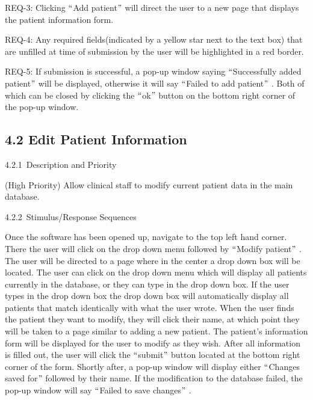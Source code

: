 \documentclass[12pt]{article}
\renewcommand{\_}{\kern-1.5pt\textunderscore\kern-1.5pt}
\begin{document}
\begin{adjustwidth}{0.5in}{0.0in}
REQ-3: Clicking $``$Add patient$"$  will direct the user to a new page that displays the patient information form.\par

\end{adjustwidth}

\begin{adjustwidth}{0.5in}{0.0in}
REQ-4: Any required fields(indicated by a yellow star next to the text box) that are unfilled at time of submission by the user will be highlighted in a red border. \par

\end{adjustwidth}

\begin{adjustwidth}{0.5in}{0.0in}
REQ-5: If submission is successful, a pop-up window saying $``$Successfully added patient$"$  will be displayed, otherwise it will say $``$Failed to add patient$"$ . Both of which can be closed by clicking the $``$ok$"$  button on the bottom right corner of the pop-up window.\par

\end{adjustwidth}

\setlength{\parskip}{3.96pt}
\subsection*{4.2 \hspace*{10pt}Edit Patient Information}
\setlength{\parskip}{12.0pt}
4.2.1\  \tab Description and Priority\par

(High Priority) Allow clinical staff to modify current patient data in the main database.\par

4.2.2\  \tab Stimulus/Response Sequences\par

Once the software has been opened up, navigate to the top left hand corner. There the user will click on the drop down menu followed by $``$Modify patient$"$ . The user will be directed to a page where in the center a drop down box will be located. The user can click on the drop down menu which will display all patients currently in the database, or they can type in the drop down box. If the user types in the drop down box the drop down box will automatically display all patients that match identically with what the user wrote. When the user finds the patient they want to modify, they will click their name, at which point they will be taken to a page similar to adding a new patient. The patient's information form will be displayed for the user to modify as they wish. After all information is filled out, the user will click the $``$submit$"$  button located at the bottom right corner of the form. Shortly after, a pop-up window will display either $``$Changes saved for$"$  followed by their name. If the modification to the database failed, the pop-up window will say $``$Failed to save changes$"$ .\par
\end{document}
